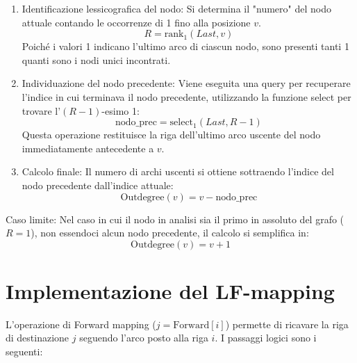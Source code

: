 \documentclass[a4paper,11pt]{article}
\begin{document}
\begin{enumerate}
    \item Identificazione lessicografica del nodo: Si determina il "numero" del nodo attuale contando le occorrenze di 1 fino alla posizione $v$.
    $$ R = \text{rank}_1(Last, v) $$
    Poiché i valori 1 indicano l'ultimo arco di ciascun nodo, sono presenti tanti 1 quanti sono i nodi unici incontrati.
    
    \item Individuazione del nodo precedente: Viene eseguita una query per recuperare l'indice in cui terminava il nodo precedente, utilizzando la funzione select per trovare l'$(R-1)$-esimo 1:
    $$ \text{nodo\_prec} = \text{select}_1(Last, R-1) $$
    Questa operazione restituisce la riga dell'ultimo arco uscente del nodo immediatamente antecedente a $v$.
    
    \item Calcolo finale: Il numero di archi uscenti si ottiene sottraendo l'indice del nodo precedente dall'indice attuale:
    $$ \text{Outdegree}(v) = v - \text{nodo\_prec} $$
\end{enumerate}

Caso limite: Nel caso in cui il nodo in analisi sia il primo in assoluto del grafo ($R = 1$), non essendoci alcun nodo precedente, il calcolo si semplifica in:
$$ \text{Outdegree}(v) = v + 1 $$

\section{Implementazione del LF-mapping}
L'operazione di Forward mapping ($j = \text{Forward}[i]$) permette di ricavare la riga di destinazione $j$ seguendo l'arco posto alla riga $i$. I passaggi logici sono i seguenti:
\end{document}
